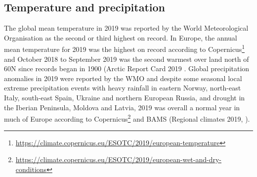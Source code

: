 \subsection{Temperature and precipitation}
The global mean temperature in 2019 was reported by the World Meteorological Organisation \citep{WMO1248:2020} as the second or third highest on record. In Europe, the annual mean temperature for 2019 was the highest on record according to Copernicus\footnote{\url{https://climate.copernicus.eu/ESOTC/2019/european-temperature}} and October 2018 to September 2019 was the second warmest over land north of 60\degrees N since records began in 1900 (Arctic Report Card 2019 \citep{Overland:ARC2019}.
Global precipitation anomalies in 2019 were reported by the WMO \citep{WMO1248:2020} and despite some seasonal local extreme precipitation events with heavy rainfall in eastern Norway, north-east Italy, south-east Spain, Ukraine and northern European Russia, and drought in the Iberian Peninsula, Moldova and Latvia, 2019 was overall a normal year in much of Europe according to Copernicus\footnote{\url{https://climate.copernicus.eu/ESOTC/2019/european-wet-and-dry-conditions}} and BAMS (Regional climates 2019, \citep{Bissolli:2020}).

